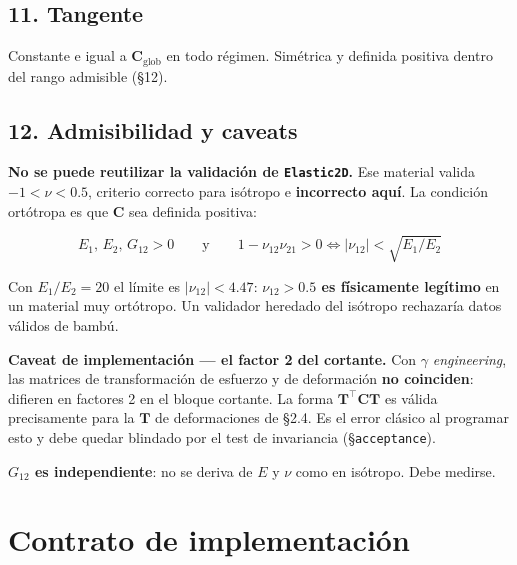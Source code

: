 \documentclass[11pt,letterpaper,oneside]{report}
\begin{document}
\subsection{11. Tangente}

Constante e igual a $\mathbf C_{\text{glob}}$ en todo régimen. Simétrica y definida positiva dentro del rango admisible (§12).

\subsection{12. Admisibilidad y caveats}

\textbf{No se puede reutilizar la validación de \texttt{Elastic2D}.} Ese material valida $-1<\nu<0.5$, criterio correcto para isótropo e \textbf{incorrecto aquí}. La condición ortótropa es que $\mathbf C$ sea definida positiva:

\[
E_1,\,E_2,\,G_{12} > 0 \qquad\text{y}\qquad 1-\nu_{12}\nu_{21} > 0 \iff |\nu_{12}| < \sqrt{E_1/E_2}
\]

Con $E_1/E_2=20$ el límite es $|\nu_{12}|<4.47$: \textbf{$\nu_{12}>0.5$ es físicamente legítimo} en un material muy ortótropo. Un validador heredado del isótropo rechazaría datos válidos de bambú.

\textbf{Caveat de implementación --- el factor 2 del cortante.} Con $\gamma$ \textit{engineering}, las matrices de transformación de esfuerzo y de deformación \textbf{no coinciden}: difieren en factores 2 en el bloque cortante. La forma $\mathbf T^\top\mathbf C\mathbf T$ es válida precisamente para la $\mathbf T$ de deformaciones de §2.4. Es el error clásico al programar esto y debe quedar blindado por el test de invariancia (§\texttt{acceptance}).

\textbf{$G_{12}$ es independiente}: no se deriva de $E$ y $\nu$ como en isótropo. Debe medirse.


\section{Contrato de implementación}
\end{document}

